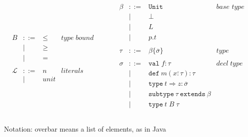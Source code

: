 \documentclass{article}
\newcommand{\keywadj}[1]{\mathtt{#1}}
\newcommand{\keyw}[1]{\keywadj{#1}~}
\begin{document}
\[\begin{array}{lll}
\begin{array}{lllr}
&&\\
B & ::= & \leq & type \; bound \\
  & |   & \geq \\
  & |   & = \\
&&\\
\mathscr{L} & ::= & n & literals \\
& | & unit &\\
\end{array}
& ~~~~~~
&
\begin{array}{lllr}
\beta & ::= & \keyw{Unit} & \textit{base type} \\
	   & |   & \boxed{\bot} \\
      & |   & L \\
      & |   & \boxed{p.t} \\
&&\\
\tau & ::= & \beta \{\overline{\sigma}\} & type \\
&&\\
\sigma & ::= & \texttt{val} \; f:\tau & decl \; type\\
       & |   & \keyw{def} m(\overline{x:\tau}) : \tau &\\
       & |   & \boxed{\keyw{type} t \Rightarrow z: \overline{\sigma}} &\\
       & |   & \keyw{subtype} \tau ~\keyw{extends} \beta &\\
       & |   & \boxed{\keyw{type} t \; B \; \tau} &\\
&&\\
\end{array}
\end{array}
\]

Notation: overbar means a list of elements, as in Java
\end{document}
